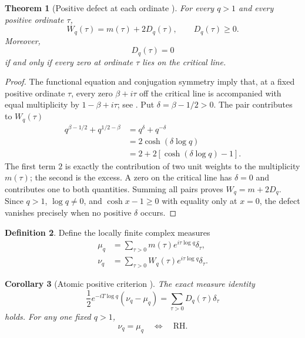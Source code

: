 \documentclass[11pt]{amsart}
\numberwithin{equation}{section}
\theoremstyle{plain}
\newtheorem{theorem}{Theorem}[section]
\newtheorem{corollary}[theorem]{Corollary}
\theoremstyle{definition}
\newtheorem{definition}[theorem]{Definition}
\theoremstyle{remark}
\newcommand{\RH}{\mathrm{RH}}
\newcommand{\1}{\mathbf{1}}
\begin{document}
\begin{theorem}[Positive defect at each ordinate {}]
\label{thm:positive_defect}
For every \(q>1\) and every positive ordinate \(\tau\),
\begin{equation}
\boxed{
W_q(\tau)=m(\tau)+2D_q(\tau),
\qquad
D_q(\tau)\geq0.
}
\label{eq:W_m_D}
\end{equation}
Moreover,
\begin{equation}
D_q(\tau)=0
\label{eq:Dq_zero_condition}
\end{equation}
if and only if every zero at ordinate \(\tau\) lies on the critical line.
\end{theorem}

\begin{proof}
The functional equation and conjugation symmetry imply that, at a fixed
positive ordinate \(\tau\), every zero \(\beta+i\tau\) off the critical
line is accompanied with equal multiplicity by
\(1-\beta+i\tau\); see \cite[Chapter~2]{Titchmarsh1986}.  Put
\(\delta=\beta-1/2>0\).  The pair contributes to \(W_q(\tau)\)
\begin{align}
q^{\beta-1/2}+q^{1/2-\beta}
&=
q^\delta+q^{-\delta}
\label{eq:defect_pair_one}
\\
&=
2\cosh(\delta\log q)
\label{eq:defect_pair_two}
\\
&=
2+2\left[\cosh(\delta\log q)-1\right].
\label{eq:defect_pair_three}
\end{align}
The first term \(2\) is exactly the contribution of two unit weights to
the multiplicity \(m(\tau)\); the second is the excess.  A zero on the
critical line has \(\delta=0\) and contributes one to both quantities.
Summing all pairs proves \(W_q=m+2D_q\).  Since \(q>1\),
\(\log q\neq0\), and \(\cosh x-1\geq0\) with equality only at \(x=0\),
the defect vanishes precisely when no positive \(\delta\) occurs.
\end{proof}

\begin{definition}
\label{def:atomic_measures}
Define the locally finite complex measures
\begin{align}
\mu_q
&=
\sum_{\tau>0}
m(\tau)e^{i\tau\log q}\delta_\tau,
\label{eq:muq_measure}
\\
\nu_q
&=
\sum_{\tau>0}
W_q(\tau)e^{i\tau\log q}\delta_\tau.
\label{eq:nuq_measure}
\end{align}
\end{definition}


\begin{corollary}[Atomic positive criterion {}]
\label{cor:atomic_positive_criterion}
The exact measure identity
\begin{equation}
\boxed{
\frac12e^{-iT\log q}(\nu_q-\mu_q)
=
\sum_{\tau>0}D_q(\tau)\delta_\tau
}
\label{eq:positive_measure_identity}
\end{equation}
holds.  For any one fixed \(q>1\),
\begin{equation}
\nu_q=\mu_q
\quad\Longleftrightarrow\quad
\RH.
\label{eq:measure_RH_equivalence}
\end{equation}
\end{corollary}
\end{document}

